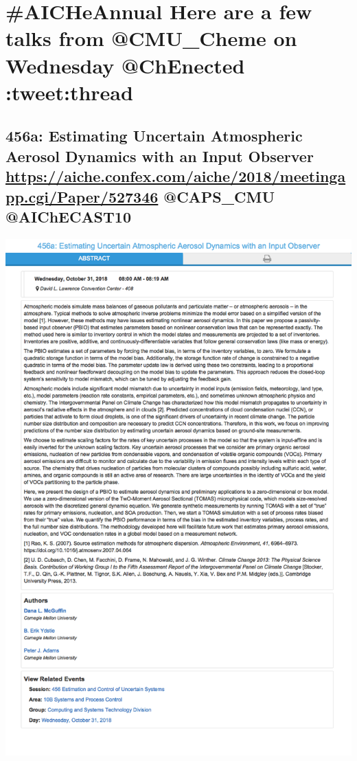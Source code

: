 \documentclass[11pt]{article}
\begin{document}
\section{\#AICHeAnnual Here are a few talks from @CMU\_Cheme on Wednesday @ChEnected :tweet:thread}
\label{sec:org2a2b8eb}
\subsection{456a: Estimating Uncertain Atmospheric Aerosol Dynamics with an Input Observer \url{https://aiche.confex.com/aiche/2018/meetingapp.cgi/Paper/527346} @CAPS\_CMU @AIChECAST10}
\label{sec:orge3313f9}
\begin{center}
\includegraphics[width=.9\linewidth]{./527346.png}
\end{center}
\end{document}
